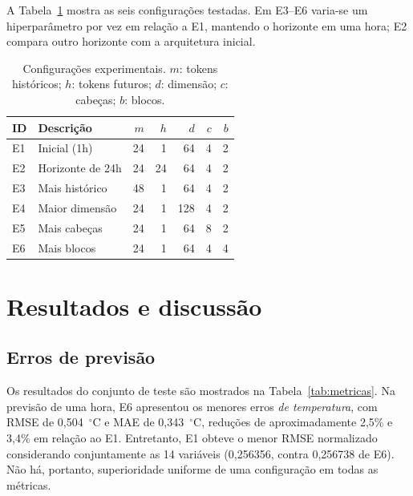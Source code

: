 \documentclass[conference,a4paper]{IEEEtran}
\begin{document}
A Tabela~\ref{tab:config} mostra as seis configurações testadas. Em E3--E6 varia-se um hiperparâmetro por vez em relação a E1, mantendo o horizonte em uma hora; E2 compara outro horizonte com a arquitetura inicial.

\begin{table}[!t]
\centering
\caption{Configurações experimentais. $m$: tokens históricos; $h$: tokens futuros; $d$: dimensão; $c$: cabeças; $b$: blocos.}
\label{tab:config}
\footnotesize
\begin{tabular}{@{}llrrrrr@{}}
\toprule
ID & Descrição & $m$ & $h$ & $d$ & $c$ & $b$ \\
\midrule
E1 & Inicial (1h) & 24 & 1 & 64 & 4 & 2 \\
E2 & Horizonte de 24h & 24 & 24 & 64 & 4 & 2 \\
E3 & Mais histórico & 48 & 1 & 64 & 4 & 2 \\
E4 & Maior dimensão & 24 & 1 & 128 & 4 & 2 \\
E5 & Mais cabeças & 24 & 1 & 64 & 8 & 2 \\
E6 & Mais blocos & 24 & 1 & 64 & 4 & 4 \\
\bottomrule
\end{tabular}
\end{table}

\section{Resultados e discussão}
\subsection{Erros de previsão}
Os resultados do conjunto de teste são mostrados na Tabela~\ref{tab:metricas}. Na previsão de uma hora, E6 apresentou os menores erros \emph{de temperatura}, com RMSE de 0,504~$^\circ$C e MAE de 0,343~$^\circ$C, reduções de aproximadamente 2,5\% e 3,4\% em relação ao E1. Entretanto, E1 obteve o menor RMSE normalizado considerando conjuntamente as 14 variáveis (0,256356, contra 0,256738 de E6). Não há, portanto, superioridade uniforme de uma configuração em todas as métricas.
\end{document}
